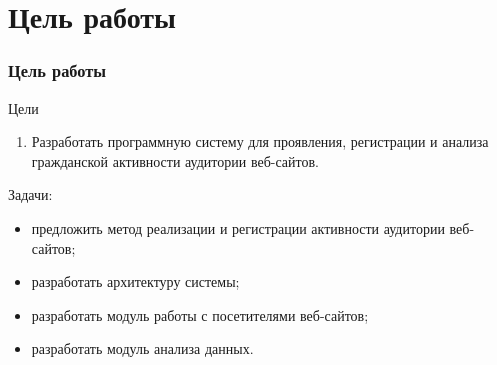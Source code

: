\section{Цель работы}
\begin{frame}
\frametitle{Цель работы}
\begin{block}{Цели}
\begin{enumerate}
  \item Разработать программную систему для проявления, регистрации и анализа гражданской активности аудитории веб-сайтов.
\end{enumerate}
\end{block}
Задачи:
\begin{itemize}
  \item предложить метод реализации и регистрации активности аудитории веб-сайтов;
  \item разработать архитектуру системы;
  \item разработать модуль работы с посетителями веб-сайтов;
  \item разработать модуль анализа данных.
\end{itemize}
\end{frame}